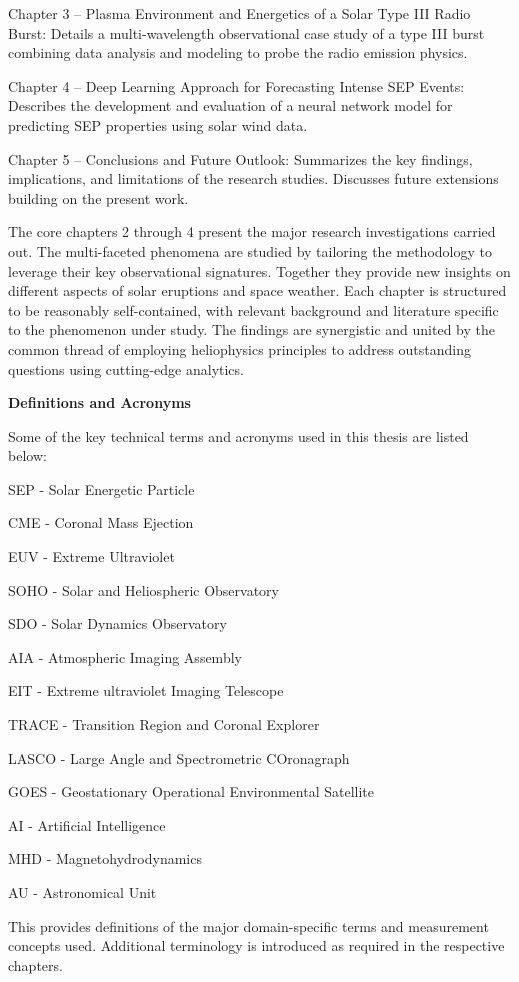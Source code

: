 Chapter 3 – Plasma Environment and Energetics of a Solar Type III Radio Burst: Details a multi-wavelength observational case study of a type III burst combining data analysis and modeling to probe the radio emission physics. 

Chapter 4 – Deep Learning Approach for Forecasting Intense SEP Events: Describes the development and evaluation of a neural network model for predicting SEP properties using solar wind data.

Chapter 5 – Conclusions and Future Outlook: Summarizes the key findings, implications, and limitations of the research studies. Discusses future extensions building on the present work.

The core chapters 2 through 4 present the major research investigations carried out. The multi-faceted phenomena are studied by tailoring the methodology to leverage their key observational signatures. Together they provide new insights on different aspects of solar eruptions and space weather. Each chapter is structured to be reasonably self-contained, with relevant background and literature specific to the phenomenon under study. The findings are synergistic and united by the common thread of employing heliophysics principles to address outstanding questions using cutting-edge analytics.

\textbf{Definitions and Acronyms}

Some of the key technical terms and acronyms used in this thesis are listed below:

SEP - Solar Energetic Particle

CME - Coronal Mass Ejection 

EUV - Extreme Ultraviolet

SOHO - Solar and Heliospheric Observatory

SDO - Solar Dynamics Observatory

AIA - Atmospheric Imaging Assembly 

EIT - Extreme ultraviolet Imaging Telescope

TRACE - Transition Region and Coronal Explorer

LASCO - Large Angle and Spectrometric COronagraph

GOES - Geostationary Operational Environmental Satellite

AI - Artificial Intelligence

MHD - Magnetohydrodynamics

AU - Astronomical Unit

This provides definitions of the major domain-specific terms and measurement concepts used. Additional terminology is introduced as required in the respective chapters.

